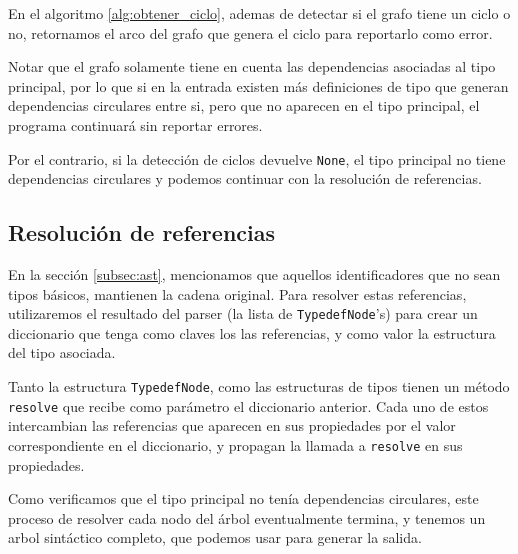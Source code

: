En el algoritmo \ref{alg:obtener_ciclo}, ademas de detectar si el grafo tiene un
ciclo o no, retornamos el arco del grafo que genera el ciclo para reportarlo
como error.

Notar que el grafo solamente tiene en cuenta las dependencias asociadas al tipo
principal, por lo que si en la entrada existen más definiciones de tipo que
generan dependencias circulares entre si, pero que no aparecen en el tipo
principal, el programa continuará sin reportar errores.

Por el contrario, si la detección de ciclos devuelve \texttt{None}, el tipo
principal no tiene dependencias circulares y podemos continuar con la resolución
de referencias.

\subsection{Resolución de referencias}

En la sección \ref{subsec:ast}, mencionamos que aquellos identificadores que no
sean tipos básicos, mantienen la cadena original. Para resolver estas
referencias, utilizaremos el resultado del parser (la lista de
\texttt{TypedefNode}'s) para crear un diccionario que tenga como claves los
las referencias, y como valor la estructura del tipo asociada.

Tanto la estructura \texttt{TypedefNode}, como las estructuras de tipos
tienen un método \texttt{resolve} que recibe como parámetro el diccionario
anterior. Cada uno de estos intercambian las referencias que aparecen en sus
propiedades por el valor correspondiente en el diccionario, y propagan la
llamada a \texttt{resolve} en sus propiedades.

Como verificamos que el tipo principal no tenía dependencias circulares, este
proceso de resolver cada nodo del árbol eventualmente termina, y tenemos un
arbol sintáctico completo, que podemos usar para generar la salida.

